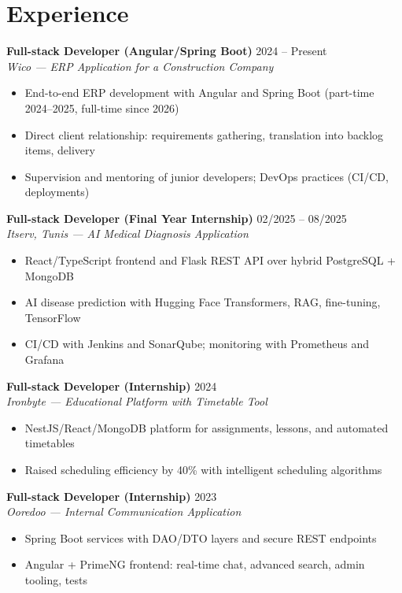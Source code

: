 \documentclass[10pt,a4paper]{article}
\begin{document}
\section*{Experience}
{\small

\textbf{Full-stack Developer (Angular/Spring Boot)} \hfill 2024 -- Present\\
{\itshape Wico --- ERP Application for a Construction Company}
\begin{itemize}[leftmargin=14pt,itemsep=0pt,topsep=1pt,parsep=0pt]
  \item End-to-end ERP development with Angular and Spring Boot (part-time 2024--2025, full-time since 2026)
  \item Direct client relationship: requirements gathering, translation into backlog items, delivery
  \item Supervision and mentoring of junior developers; DevOps practices (CI/CD, deployments)
\end{itemize}

\vspace{3pt}
\textbf{Full-stack Developer (Final Year Internship)} \hfill 02/2025 -- 08/2025\\
{\itshape Itserv, Tunis --- AI Medical Diagnosis Application}
\begin{itemize}[leftmargin=14pt,itemsep=0pt,topsep=1pt,parsep=0pt]
  \item React/TypeScript frontend and Flask REST API over hybrid PostgreSQL + MongoDB
  \item AI disease prediction with Hugging Face Transformers, RAG, fine-tuning, TensorFlow
  \item CI/CD with Jenkins and SonarQube; monitoring with Prometheus and Grafana
\end{itemize}

\vspace{3pt}
\textbf{Full-stack Developer (Internship)} \hfill 2024\\
{\itshape Ironbyte --- Educational Platform with Timetable Tool}
\begin{itemize}[leftmargin=14pt,itemsep=0pt,topsep=1pt,parsep=0pt]
  \item NestJS/React/MongoDB platform for assignments, lessons, and automated timetables
  \item Raised scheduling efficiency by 40\% with intelligent scheduling algorithms
\end{itemize}

\vspace{3pt}
\textbf{Full-stack Developer (Internship)} \hfill 2023\\
{\itshape Ooredoo --- Internal Communication Application}
\begin{itemize}[leftmargin=14pt,itemsep=0pt,topsep=1pt,parsep=0pt]
  \item Spring Boot services with DAO/DTO layers and secure REST endpoints
  \item Angular + PrimeNG frontend: real-time chat, advanced search, admin tooling, tests
\end{itemize}

}
\end{document}
